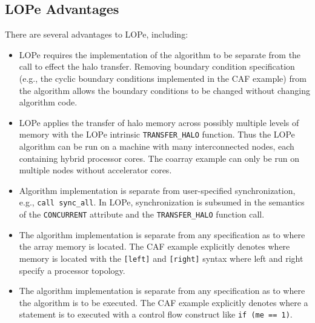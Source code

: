 
\subsection{LOPe Advantages}

There are several advantages to LOPe, including:

\begin{itemize}

\item
LOPe requires the implementation of the algorithm to be separate from the call to effect the halo
transfer.  Removing boundary condition specification (e.g., the cyclic boundary conditions
implemented in the CAF example) from the algorithm allows the boundary conditions to be changed
without changing algorithm code.

\item
LOPe applies the transfer of halo memory across possibly multiple levels of memory with the LOPe
intrinsic \texttt{TRANSFER\_HALO} function.  Thus the LOPe algorithm can be run on a machine with
many interconnected nodes, each containing hybrid processor cores.  The coarray example can only be
run on multiple nodes without accelerator cores.

\item
Algorithm implementation is separate from user-specified synchronization, e.g., \texttt{call
  sync\_all}.  In LOPe, synchronization is subsumed in the semantics of the \texttt{CONCURRENT}
attribute and the \texttt{TRANSFER\_HALO} function call.

\item
The algorithm implementation is separate from any specification as to where the array
memory is located.  The CAF example explicitly denotes where memory is located with the
\texttt{[left]} and \texttt{[right]} syntax where left and right specify a processor
topology.

\item
The algorithm implementation is separate from any specification as to where the algorithm
is to be executed.  The CAF example explicitly denotes where a statement is to executed
with a control flow construct like \texttt{if (me == 1)}.


\end{itemize}
